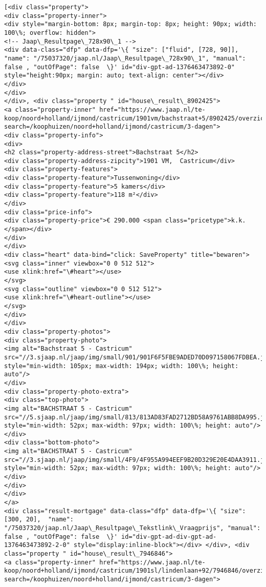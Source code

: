 \documentclass[11pt]{article}
\begin{document}
    \begin{Verbatim}[commandchars=\\\{\}]
[<div class="property">
<div class="property-inner">
<div style="margin-bottom: 8px; margin-top: 8px; height: 90px; width: 100\%; overflow: hidden">
<!-- Jaap\_Resultpage\_728x90\_1 -->
<div data-class="dfp" data-dfp='\{ "size": ["fluid", [728, 90]],  "name": "/75037320/jaap.nl/Jaap\_Resultpage\_728x90\_1", "manual": false , "outOfPage": false  \}' id="div-gpt-ad-1376463473892-0" style="height:90px; margin: auto; text-align: center"></div>
</div>
</div>
</div>, <div class="property " id="house\_result\_8902425">
<a class="property-inner" href="https://www.jaap.nl/te-koop/noord+holland/ijmond/castricum/1901vm/bachstraat+5/8902425/overzicht?search=/koophuizen/noord+holland/ijmond/castricum/3-dagen">
<div class="property-info">
<div>
<h2 class="property-address-street">Bachstraat 5</h2>
<div class="property-address-zipcity">1901 VM,  Castricum</div>
<div class="property-features">
<div class="property-feature">Tussenwoning</div>
<div class="property-feature">5 kamers</div>
<div class="property-feature">118 m²</div>
</div>
<div class="price-info">
<div class="property-price">€ 290.000 <span class="pricetype">k.k.</span></div>
</div>
</div>
<div class="heart" data-bind="click: SaveProperty" title="bewaren">
<svg class="inner" viewbox="0 0 512 512">
<use xlink:href="\#heart"></use>
</svg>
<svg class="outline" viewbox="0 0 512 512">
<use xlink:href="\#heart-outline"></use>
</svg>
</div>
</div>
<div class="property-photos">
<div class="property-photo">
<img alt="Bachstraat 5 - Castricum" src="//3.sjaap.nl/jaap/img/small/901/901F6F5FBE9ADED70D097158067FDBEA.jpg" style="min-width: 105px; max-width: 194px; width: 100\%; height: auto"/>
</div>
<div class="property-photo-extra">
<div class="top-photo">
<img alt="BACHSTRAAT 5 - Castricum" src="//5.sjaap.nl/jaap/img/small/813/813AD83FAD2712BD58A9761ABB8DA995.jpg" style="min-width: 52px; max-width: 97px; width: 100\%; height: auto"/>
</div>
<div class="bottom-photo">
<img alt="BACHSTRAAT 5 - Castricum" src="//3.sjaap.nl/jaap/img/small/4F9/4F955A994EEF9B20D329E20E4DAA3911.jpg" style="min-width: 52px; max-width: 97px; width: 100\%; height: auto"/>
</div>
</div>
</div>
</a>
<div class="result-mortgage" data-class="dfp" data-dfp='\{ "size": [300, 20],  "name": "/75037320/jaap.nl/Jaap\_Resultpage\_Tekstlink\_Vraagprijs", "manual": false , "outOfPage": false  \}' id="div-gpt-ad-div-gpt-ad-1376463473892-2-0" style="display:inline-block"></div> </div>, <div class="property " id="house\_result\_7946846">
<a class="property-inner" href="https://www.jaap.nl/te-koop/noord+holland/ijmond/castricum/1901sl/lindenlaan+92/7946846/overzicht?search=/koophuizen/noord+holland/ijmond/castricum/3-dagen">

\end{Verbatim}
\end{document}
